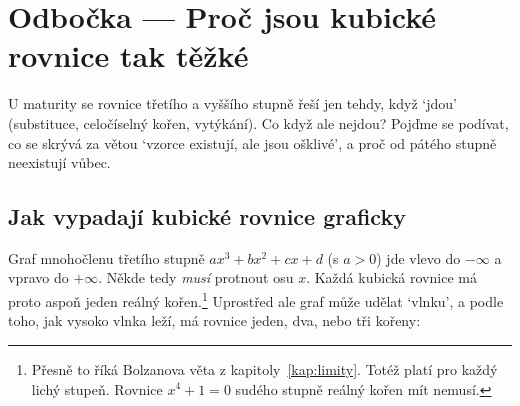 \section{Odbočka --- Proč jsou kubické rovnice tak těžké}\label{sec:kubicke}

U maturity se rovnice třetího a vyššího stupně řeší jen tehdy, když `jdou' (substituce, celočíselný kořen, vytýkání). Co když ale nejdou? Pojďme se podívat, co se skrývá za větou `vzorce existují, ale jsou ošklivé', a proč od pátého stupně neexistují vůbec.

\subsection*{Jak vypadají kubické rovnice graficky}

Graf mnohočlenu třetího stupně $ax^3 + bx^2 + cx + d$ (s $a > 0$) jde vlevo do $-\infty$ a vpravo do $+\infty$. Někde tedy \textit{musí} protnout osu $x$. Každá kubická rovnice má proto aspoň jeden reálný kořen.\footnote{Přesně to říká Bolzanova věta z kapitoly~\ref{kap:limity}. Totéž platí pro každý lichý stupeň. Rovnice $x^4 + 1 = 0$ sudého stupně reálný kořen mít nemusí.} Uprostřed ale graf může udělat `vlnku', a podle toho, jak vysoko vlnka leží, má rovnice jeden, dva, nebo tři kořeny:

\begin{center}
\end{center}


